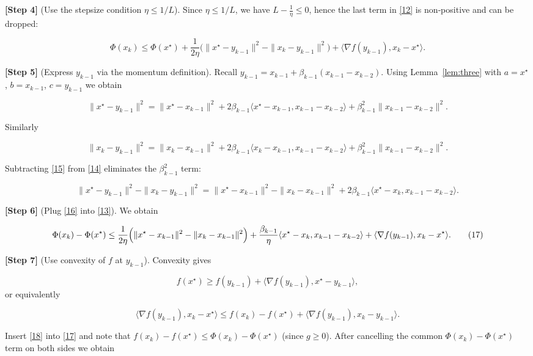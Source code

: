 \documentclass{article}
\begin{document}
\noindent\textbf{[Step 4]} (Use the stepsize condition $\eta\le 1/L$).  
Since $\eta\le 1/L$, we have $L-\frac{1}{\eta}\le 0$, hence the last term in \eqref{12} is non‑positive and can be dropped:

\[
\Phi(x_{k})\le \Phi(x^{\star})+\frac{1}{2\eta}\bigl(\|x^{\star}-y_{k-1}\|^{2}-\|x_{k}-y_{k-1}\|^{2}\bigr)
+\langle\nabla f(y_{k-1}),x_{k}-x^{\star}\rangle. \tag{13}
\]

\noindent\textbf{[Step 5]} (Express $y_{k-1}$ via the momentum definition).  
Recall $y_{k-1}=x_{k-1}+ \beta_{k-1}(x_{k-1}-x_{k-2})$.  
Using Lemma~\ref{lem:three} with $a=x^{\star}$, $b=x_{k-1}$, $c=y_{k-1}$ we obtain  

\[
\|x^{\star}-y_{k-1}\|^{2}= \|x^{\star}-x_{k-1}\|^{2}+2\beta_{k-1}\langle x^{\star}-x_{k-1}, x_{k-1}-x_{k-2}\rangle+\beta_{k-1}^{2}\|x_{k-1}-x_{k-2}\|^{2}. \tag{14}
\]

Similarly  

\[
\|x_{k}-y_{k-1}\|^{2}= \|x_{k}-x_{k-1}\|^{2}+2\beta_{k-1}\langle x_{k}-x_{k-1}, x_{k-1}-x_{k-2}\rangle+\beta_{k-1}^{2}\|x_{k-1}-x_{k-2}\|^{2}. \tag{15}
\]

Subtracting \eqref{15} from \eqref{14} eliminates the $\beta_{k-1}^{2}$ term:

\[
\|x^{\star}-y_{k-1}\|^{2}-\|x_{k}-y_{k-1}\|^{2}
= \|x^{\star}-x_{k-1}\|^{2}-\|x_{k}-x_{k-1}\|^{2}
+2\beta_{k-1}\langle x^{\star}-x_{k}, x_{k-1}-x_{k-2}\rangle . \tag{16}
\]

\noindent\textbf{[Step 6]} (Plug \eqref{16} into \eqref{13}).  
We obtain  

\[
\Phi(x_{k})-\Phi(x^{\star})
\le \frac{1}{2\eta}\Bigl(\|x^{\star}-x_{k-1}\|^{2}-\|x_{k}-x_{k-1}\|^{2}\Bigr)
+\frac{\beta_{k-1}}{\eta}\langle x^{\star}-x_{k}, x_{k-1}-x_{k-2}\rangle
+\langle\nabla f(y_{k-1}),x_{k}-x^{\star}\rangle . \tag{17}
\]

\noindent\textbf{[Step 7]} (Use convexity of $f$ at $y_{k-1}$).  
Convexity gives  

\[
f(x^{\star})\ge f(y_{k-1})+\langle\nabla f(y_{k-1}),x^{\star}-y_{k-1}\rangle,
\]
or equivalently  

\[
\langle\nabla f(y_{k-1}),x_{k}-x^{\star}\rangle
\le f(x_{k})-f(x^{\star})+\langle\nabla f(y_{k-1}),x_{k}-y_{k-1}\rangle . \tag{18}
\]

Insert \eqref{18} into \eqref{17} and note that $f(x_{k})-f(x^{\star})\le \Phi(x_{k})-\Phi(x^{\star})$ (since $g\ge0$). After cancelling the common $\Phi(x_{k})-\Phi(x^{\star})$ term on both sides we obtain  
\end{document}
